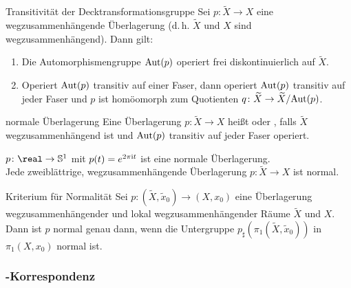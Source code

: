 \linie

\begin{Satz}{Transitivität der Decktransformationsgruppe}
    Sei $p\colon \widetilde{X} \rightarrow X$ eine
    wegzusammenhängende Überlagerung (d.\,h. $\widetilde{X}$ und $X$ sind
    wegzusammenhängend). Dann gilt:
    \begin{enumerate}
        \item
        Die Automorphismengruppe $\text{Aut}(p)$ operiert frei diskontinuierlich auf
        $\widetilde{X}$.

        \item
        Operiert $\text{Aut}(p)$ transitiv auf einer Faser, dann operiert
        $\text{Aut}(p)$ transitiv auf jeder Faser und $p$ ist homöomorph zum
        Quotienten $q\colon \widetilde{X} \rightarrow \widetilde{X}/\text{Aut}(p)$.
    \end{enumerate}
\end{Satz}

\linie

\begin{Def}{normale Überlagerung}
    Eine Überlagerung $p\colon \widetilde{X} \rightarrow X$ heißt
     oder , falls $\widetilde{X}$
    wegzusammenhängend ist und $\text{Aut}(p)$ transitiv auf jeder Faser operiert.
\end{Def}

\begin{Bsp}
    $p\colon \real \rightarrow \sphere^1$ mit $p(t) = e^{2\pi\mathrm{i} t}$ ist eine
    normale Überlagerung. \\
    Jede zweiblättrige, wegzusammenhängende Überlagerung
    $p\colon \widetilde{X} \rightarrow X$ ist normal.
\end{Bsp}

\begin{Satz}{Kriterium für Normalität}
    Sei $p\colon (\widetilde{X}, \widetilde{x}_0) \rightarrow (X, x_0)$ eine
    Überlagerung wegzusammenhängender und lokal wegzusammenhängender Räume
    $\widetilde{X}$ und $X$. \\
    Dann ist $p$ normal genau dann, wenn die Untergruppe
    $p_\sharp(\pi_1(\widetilde{X}, \widetilde{x}_0))$ in $\pi_1(X, x_0)$
    normal ist.
\end{Satz}

\pagebreak

\subsubsection{%
    -Korrespondenz%
}

